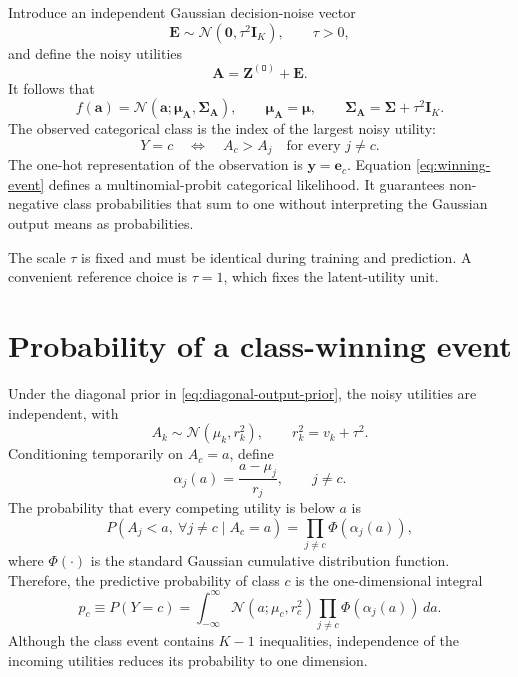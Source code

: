 \documentclass[11pt]{article}
\newcommand{\Normal}{\mathcal{N}}
\newcommand{\Olayer}{\mathtt{O}}
\begin{document}
Introduce an independent Gaussian decision-noise vector
\begin{equation}
 \bm E \sim \Normal(\bm 0,\tau^2\mathbf I_K),
 \qquad \tau>0,
 \label{eq:decision-noise}
\end{equation}
and define the noisy utilities
\begin{equation}
 \bm A = \bm Z^{(\Olayer)} + \bm E.
 \label{eq:noisy-utilities}
\end{equation}
It follows that
\begin{equation}
 f(\bm a)
 =
 \Normal(\bm a;\bm\mu_{\bm A},\bm\Sigma_{\bm A}),
 \qquad
 \bm\mu_{\bm A}=\bm\mu,
 \qquad
 \bm\Sigma_{\bm A}=\bm\Sigma+\tau^2\mathbf I_K.
 \label{eq:utility-prior}
\end{equation}
The observed categorical class is the index of the largest noisy utility:
\begin{equation}
 Y=c
 \quad\Longleftrightarrow\quad
 A_c>A_j \quad\text{for every }j\ne c.
 \label{eq:winning-event}
\end{equation}
The one-hot representation of the observation is $\bm y=\bm e_c$.  Equation
\eqref{eq:winning-event} defines a multinomial-probit categorical likelihood.
It guarantees non-negative class probabilities that sum to one without
interpreting the Gaussian output means as probabilities.

The scale $\tau$ is fixed and must be identical during training and prediction.
A convenient reference choice is $\tau=1$, which fixes the latent-utility unit.

\section{Probability of a class-winning event}

Under the diagonal prior in \eqref{eq:diagonal-output-prior}, the noisy
utilities are independent, with
\begin{equation}
 A_k\sim\Normal(\mu_k,r_k^2),
 \qquad
 r_k^2=v_k+\tau^2.
 \label{eq:utility-marginal}
\end{equation}
Conditioning temporarily on $A_c=a$, define
\begin{equation}
 \alpha_j(a)=\frac{a-\mu_j}{r_j},
 \qquad j\ne c.
\end{equation}
The probability that every competing utility is below $a$ is
\begin{equation}
 P(A_j<a,\ \forall j\ne c\mid A_c=a)
 =
 \prod_{j\ne c}\Phi\!\left(\alpha_j(a)\right),
\end{equation}
where $\Phi(\cdot)$ is the standard Gaussian cumulative distribution function.
Therefore, the predictive probability of class $c$ is the one-dimensional
integral
\begin{equation}
 p_c
 \equiv P(Y=c)
 =
 \int_{-\infty}^{\infty}
 \Normal(a;\mu_c,r_c^2)
 \prod_{j\ne c}\Phi\!\left(\alpha_j(a)\right)
 \,da.
 \label{eq:class-probability}
\end{equation}
Although the class event contains $K-1$ inequalities, independence of the
incoming utilities reduces its probability to one dimension.
\end{document}
